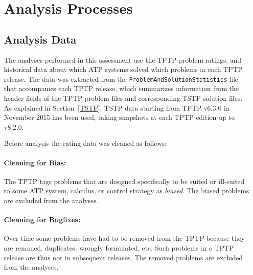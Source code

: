 \documentclass[runningheads]{llncs}
\begin{document}
\section{Analysis Processes}
\label{AnalysisProcesses}

\subsection{Analysis Data}
\label{AnalysisData}

The analyses performed in this assessment use the TPTP problem ratings, and historical data about 
which ATP systems solved which problems in each TPTP release.
The data was extracted from the {\tt ProblemAndSolutionStatistics} file that accompanies each TPTP 
release, which summarizes information from the header fields of the TPTP problem files and
corresponding TSTP solution files.
As explained in Section~\ref{TSTP}, TSTP data starting from TPTP v6.3.0 in November 2015 has been
used, taking snapshots at each TPTP edition up to v8.2.0.

Before analysis the rating data was cleaned as follows:

\vspace*{-0.5em}
\paragraph{Cleaning for Bias:}
The TPTP tags problems that are designed specifically to be suited or ill-suited to some ATP 
system, calculus, or control strategy as {\em biased}. 
The biased problems are excluded from the analyses.

\vspace*{-0.5em}
\paragraph{Cleaning for Bugfixes:}
Over time some problems have had to be removed from the TPTP because they are renamed, duplicates, 
wrongly formulated, etc.
Such problems in a TPTP release are thus not in subsequent releases.
The removed problems are excluded from the analyses.

\vspace*{-0.5em}
\end{document}
